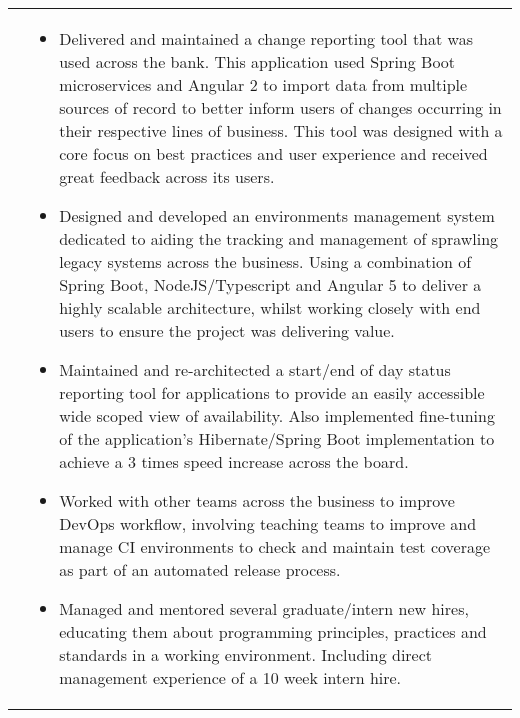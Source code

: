 \begin{tabular}{p{60pt}|p{11cm}}
    &\vspace{-0.9em}\begin{itemize}[itemsep=0pt,topsep=0pt,leftmargin=*]
                        \small
                        \item Delivered and maintained a change reporting tool that was used across the bank.
                        This application used Spring Boot microservices and Angular 2 to import data from multiple sources of record to better inform users of changes occurring in their respective lines of business.
                        This tool was designed with a core focus on best practices and user experience and received great feedback across its users.
    \end{itemize}
    \begin{itemize}[itemsep=0pt,topsep=0pt,leftmargin=*]
        \small
        \item Designed and developed an environments management system dedicated to aiding the tracking and management of sprawling legacy systems across the business.
        Using a combination of Spring Boot, NodeJS/Typescript and Angular 5 to deliver a highly scalable architecture, whilst working closely with end users to ensure the project was delivering value.
        \item Maintained and re-architected a start/end of day status reporting tool for applications to provide an easily accessible wide scoped view of availability.
        Also implemented fine-tuning of the application's Hibernate/Spring Boot implementation to achieve a 3 times speed increase across the board.
        \item Worked with other teams across the business to improve DevOps workflow, involving teaching teams to improve and manage CI environments to check and maintain test coverage as part of an automated release process.
        \item Managed and mentored several graduate/intern new hires, educating them about programming principles, practices and standards in a working environment.
        Including direct management experience of a 10 week intern hire.
    \end{itemize}\vspace{-3.8em}

\end{tabular} \\ \\ \\
